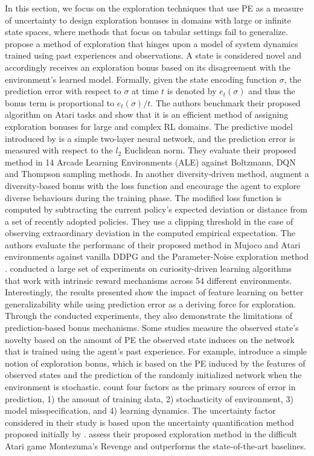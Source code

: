 \label{sec:pred-bounus-fa}
In this section, we focus on the exploration techniques that use PE as a measure of uncertainty to design exploration bonuses in domains with large or infinite state spaces, where methods that focus on tabular settings fail to generalize. 
 propose a method of exploration that hinges upon a model of system dynamics trained using past experiences and observations.  A state is considered novel and accordingly receives an exploration bonus based on its disagreement with the environment's learned model. Formally, given the state encoding function $\sigma$, the prediction error with respect to $\sigma$ at time $t$ is denoted by $e_t(\sigma)$ and thus the bonus term is proportional to ${e_t(\sigma)}/{t}$. The authors benchmark their proposed algorithm on Atari tasks and show that it is an efficient method of assigning exploration bonuses for large and complex RL domains. The predictive model introduced by  is a simple two-layer neural network, and the prediction error is measured with respect to the $l_2$ Euclidean norm. They evaluate their proposed method in 14 Arcade Learning Environments (ALE) against Boltzmann, DQN and Thompson sampling methods. 
In another diversity-driven method,  augment a diversity-based bonus with the loss function and encourage the agent to explore diverse behaviours during the training phase. The modified loss function is computed by subtracting the current policy's expected deviation or distance from a set of recently adopted policies. They use a clipping threshold in the case of observing extraordinary deviation in the computed empirical expectation. The authors evaluate the performanc of their proposed method in Mujoco and Atari environments against vanilla DDPG and the Parameter-Noise exploration method .
 conducted a large set of experiments on curiosity-driven learning algorithms that work with intrinsic reward mechanisms across 54 different environments. Interestingly, the results presented show the impact of feature learning on better generalizability while using prediction error as a deriving force for exploration. Through the conducted experiments, they also demonstrate the limitations of prediction-based bonus mechanisms.   
Some studies measure the observed state's novelty based on the amount of PE the observed state induces on the network that is trained using the agent's past experience. For example,  introduce a simple notion of exploration bonus, which is based on the PE induced by the features of observed states and the prediction of the randomly initialized network when the environment is stochastic.  count four factors as the primary sources of error in prediction, 1) the amount of training data, 2) stochasticity of environment, 3) model misspecification, and 4) learning dynamics. The uncertainty factor considered in their study is based upon the uncertainty quantification method proposed initially by .  assess their proposed exploration method in the difficult Atari game Montezuma's Revenge and outperforms the state-of-the-art baselines. 
